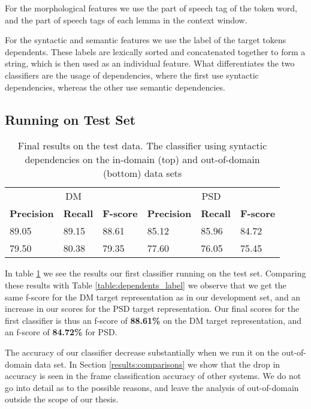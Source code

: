 For the morphological features we use the part of speech tag of the token word, and the part of speech tags of each lemma in the context window.

For the syntactic and semantic features we use the label of the target tokens dependents. These labels are lexically sorted and concatenated together to form a string, which is then used as an individual feature. What differentiates the two classifiers are the usage of dependencies, where the first use syntactic dependencies, whereas the other use semantic dependencies.

\subsection{Running on Test Set}

\begin{table}
    \centering
    \smaller[0.2]
    \begin{tabular}{@{}llllll@{}}
        \toprule
        \multicolumn{3}{c}{DM}
        & \multicolumn{3}{c}{PSD} \\
        \textbf{Precision} & \textbf{Recall} & \textbf{F-score} & \textbf{Precision} & \textbf{Recall} & \textbf{F-score} \\
        \midrule
        89.05 & 89.15 & 88.61 & 85.12 & 85.96 & 84.72 \\
        79.50 & 80.38 & 79.35 & 77.60 & 76.05 & 75.45 \\
        \bottomrule
    \end{tabular}
    \caption{Final results on the test data. The classifier using syntactic dependencies on the in-domain (top) and out-of-domain (bottom) data sets} 
    \label{table:final_results_syntax}
\end{table}

In table \ref{table:final_results_syntax} we see the results our first classifier running on the test set. Comparing these results with Table \ref{table:dependents_label} we observe that we get the same f-score for the DM target representation as in our development set, and an increase in our scores for the PSD target representation. Our final scores for the first classifier is thus an f-score of \textbf{88.61\%} on the DM target representation, and an f-score of \textbf{84.72\%} for PSD. 

The accuracy of our classifier decrease substantially when we run it on the out-of-domain data set. In Section \ref{results:comparisons} we show that the drop in accuracy is seen in the frame classification accuracy of other systems. We do not go into detail as to the possible reasons, and leave the analysis of out-of-domain outside the scope of our thesis.

